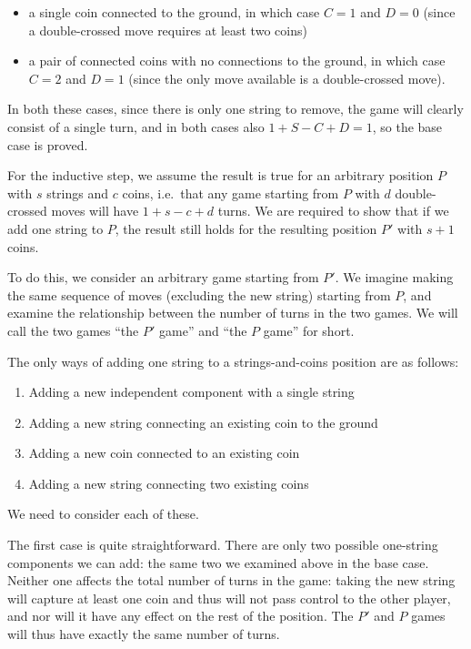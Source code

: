 \documentclass[a4paper,twocolumn]{article}
\begin{document}
\begin{itemize}
  \item a single coin connected to the ground, in which case $C=1$ and
    $D=0$ (since a double-crossed move requires at least two coins)
  \item a pair of connected coins with no connections to the ground,
    in which case $C=2$ and $D=1$ (since the only move available is
    a double-crossed move).
\end{itemize}

In both these cases, since there is only one string to remove, the
game will clearly consist of a single turn, and in both cases also
$1+S-C+D = 1$, so the base case is proved.

For the inductive step, we assume the result is true for an
arbitrary position $P$ with $s$ strings and $c$ coins, i.e.\ that any
game starting from $P$ with $d$ double-crossed moves will have
$1+s-c+d$ turns. We are required to show that if we add one string
to $P$, the result still holds for the resulting position $P'$ with
$s+1$ coins.

To do this, we consider an arbitrary game starting from $P'$. We
imagine making the same sequence of moves (excluding the new string)
starting from $P$, and examine the relationship between the number
of turns in the two games. We will call the two games ``the $P'$
game'' and ``the $P$ game'' for short.

The only ways of adding one string to a strings-and-coins position
are as follows:

\begin{enumerate}
  \item Adding a new independent component with a single string
  \item Adding a new string connecting an existing coin to the
    ground
  \item Adding a new coin connected to an existing coin
  \item Adding a new string connecting two existing coins
\end{enumerate}

We need to consider each of these.

The first case is quite straightforward. There are only two possible
one-string components we can add: the same two we examined above in
the base case. Neither one affects the total number of turns in the
game: taking the new string will capture at least one coin and thus
will not pass control to the other player, and nor will it have any
effect on the rest of the position. The $P'$ and $P$ games will thus
have exactly the same number of turns.
\end{document}
